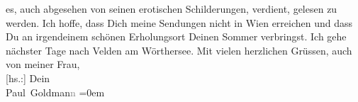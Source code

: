 \begin{ledgroupsized}[t]{13cm}
               es, auch abgesehen von seinen erotischen Schilderungen, verdient, gelesen zu
               werden.\pend
           \pstart
           Ich hoffe, dass Dich meine Sendungen nicht in Wien
               erreichen und dass Du an irgendeinem schönen Erholungsort Deinen Sommer verbringst.
               Ich gehe nächster Tage nach Velden am
               Wörthersee.\pend
           \pstart
           Mit vielen herzlichen Grüssen, auch von meiner Frau, {\\[\baselineskip]}{[}hs.:{]} Dein {\\[\baselineskip]}\spacefill\mbox{Paul Goldman\textcolor{gray}{n}}\pend
           \leftskip=0em{}
         
         \endnumbering{}\end{ledgroupsized}  \newcommand{\dateiname}{L03518}\newcommand{\titel}{Paul Goldmann an Arthur Schnitzler, 2. 8. 1931}\newcommand{\editorInnen}{Martin Anton Müller und Laura Untner}
      
